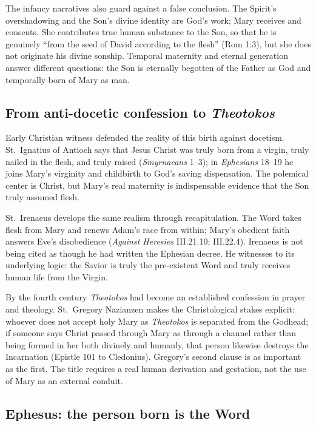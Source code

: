 The infancy narratives also guard against a false conclusion. The Spirit's overshadowing and the Son's divine identity are God's work; Mary receives and consents. She contributes true human substance to the Son, so that he is genuinely ``from the seed of David according to the flesh'' (Rom 1:3), but she does not originate his divine sonship. Temporal maternity and eternal generation answer different questions: the Son is eternally begotten of the Father as God and temporally born of Mary as man.

\subsection{From anti-docetic confession to \emph{Theotokos}}

Early Christian witness defended the reality of this birth against docetism. St.~Ignatius of Antioch says that Jesus Christ was truly born from a virgin, truly nailed in the flesh, and truly raised (\emph{Smyrnaeans} 1--3); in \emph{Ephesians} 18--19 he joins Mary's virginity and childbirth to God's saving dispensation. The polemical center is Christ, but Mary's real maternity is indispensable evidence that the Son truly assumed flesh.

St.~Irenaeus develops the same realism through recapitulation. The Word takes flesh from Mary and renews Adam's race from within; Mary's obedient faith answers Eve's disobedience (\emph{Against Heresies} III.21.10; III.22.4). Irenaeus is not being cited as though he had written the Ephesian decree. He witnesses to its underlying logic: the Savior is truly the pre-existent Word and truly receives human life from the Virgin.

By the fourth century \emph{Theotokos} had become an established confession in prayer and theology. St.~Gregory Nazianzen makes the Christological stakes explicit: whoever does not accept holy Mary as \emph{Theotokos} is separated from the Godhead; if someone says Christ passed through Mary as through a channel rather than being formed in her both divinely and humanly, that person likewise destroys the Incarnation (Epistle 101 to Cledonius). Gregory's second clause is as important as the first. The title requires a real human derivation and gestation, not the use of Mary as an external conduit.

\subsection{Ephesus: the person born is the Word}

